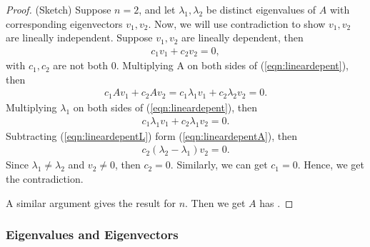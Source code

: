 \documentclass[12pt]  {article}%
\begin{document}
\begin{proof}
(Sketch) Suppose $n=2$, and  let $\lambda_1,\lambda_2$ be distinct eigenvalues of $A$ with corresponding eigenvectors $v_1,v_2$. Now, we will use contradiction to show $v_1, v_2$ are lineally independent.
Suppose $v_1, v_2$ are lineally dependent, then
\begin{eqnarray}\label{eqn:lineardepent}
c_1v_1+c_2v_2=0,
\end{eqnarray}
with $c_1, c_2$ are not both 0.
Multiplying A on both sides of (\ref{eqn:lineardepent}), then
\begin{eqnarray}\label{eqn:lineardepentA}
c_1Av_1+c_2Av_2=c_1\lambda_1v_1+c_2\lambda_2v_2=0.
\end{eqnarray}
Multiplying $\lambda_1$ on both sides of (\ref{eqn:lineardepent}), then
\begin{eqnarray}\label{eqn:lineardepentL}
c_1\lambda_1 v_1+c_2\lambda_1 v_2=0.
\end{eqnarray}
Subtracting (\ref{eqn:lineardepentL}) form (\ref{eqn:lineardepentA}), then
\begin{eqnarray}\label{eqn:lineardepentdiff}
c_2(\lambda_2-\lambda_1) v_2=0.
\end{eqnarray}
Since $\lambda_1\neq \lambda_2$ and $v_2\neq 0$, then $c_2=0$. Similarly, we can get $c_1=0$. Hence, we get the contradiction.

A similar argument gives the result for $n$. Then we get $A$ has .
\end{proof}

\subsubsection{Eigenvalues and Eigenvectors}
\end{document}
